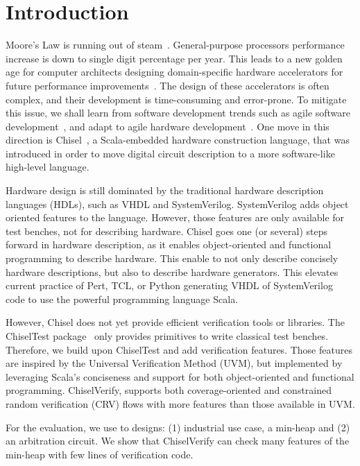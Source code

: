 \documentclass[conference]{IEEEtran}
\begin{document}
\section{Introduction}
\label{sec:introduction}

Moore's Law is running out of steam~\cite{dark-silicon:2011}.
General-purpose processors performance increase is down to single digit percentage per year.
This leads to a new golden age for computer architects designing domain-specific hardware accelerators
for future performance improvements~\cite{domain-hw-acc:2020}.
The design of these accelerators is often complex, and their development is time-consuming and error-prone.
To mitigate this issue, we shall learn from software development trends such as agile software
development~\cite{agile:manifesto}, and adapt to agile hardware development~\cite{henn-patt:turing:2019}.
One move in this direction is Chisel~\cite{chisel:dac2012}, a Scala-embedded hardware construction language,
that was introduced in order to move digital circuit description to a more software-like high-level language. 

Hardware design is still dominated by the traditional hardware description languages (HDLs), such as VHDL and SystemVerilog.
SystemVerilog adds object oriented features to the language. However, those features are only available for test benches,
not for describing hardware.
Chisel goes one (or several) steps forward in hardware description, as it enables object-oriented and functional programming
to describe hardware. This enable to not only describe concisely hardware descriptions, but also to describe hardware generators.
This elevates current practice of Pert, TCL, or Python generating VHDL of SystemVerilog code to use the powerful programming
language Scala.

However, Chisel does not yet provide efficient verification tools or libraries. The ChiselTest package~\cite{chisel:tester2}
only provides primitives to write classical test benches.
Therefore, we build upon ChiselTest and add verification features. Those features are inspired by the
Universal Verification Method (UVM), but implemented by leveraging
Scala's conciseness and support for both object-oriented and functional programming.
ChiselVerify, supports both coverage-oriented and constrained
random verification (CRV) flows with more features than those available in UVM.

For the evaluation, we use to designs: (1) industrial use case, a min-heap
and (2) an arbitration circuit.
We show that ChiselVerify can check many features of the min-heap with few lines of 
verification code.
\end{document}
